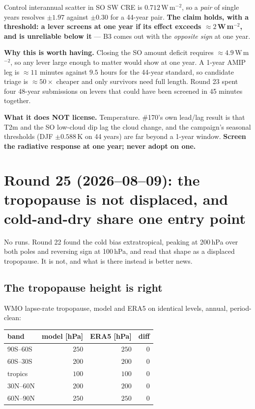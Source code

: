 \documentclass[10pt]{article}
\begin{document}
\noindent Control interannual scatter in SO SW CRE is $0.712$\,W\,m$^{-2}$, so a \emph{pair}
of single years resolves $\pm1.97$ against $\pm0.30$ for a 44-year pair. \textbf{The claim
holds, with a threshold: a lever screens at one year if its effect exceeds
${\approx}2$\,W\,m$^{-2}$, and is unreliable below it} --- B3 comes out with the
\emph{opposite sign} at one year.

\textbf{Why this is worth having.} Closing the SO amount deficit requires
${\approx}4.9$\,W\,m$^{-2}$, so any lever large enough to matter would show at one year. A
1-year AMIP leg is ${\approx}11$ minutes against $9.5$ hours for the 44-year standard, so
candidate triage is ${\approx}50\times$ cheaper and only survivors need full length. Round 23
spent four 48-year submissions on levers that could have been screened in 45 minutes
together.

\textbf{What it does NOT license.} Temperature. \#170's own lead/lag result is that T2m and
the SO low-cloud dip lag the cloud change, and the campaign's seasonal thresholds
(DJF $\pm0.588$\,K on 44 years) are far beyond a 1-year window. \textbf{Screen the radiative
response at one year; never adopt on one.}

\section{Round 25 (2026--08--09): the tropopause is not displaced, and cold-and-dry
share one entry point}\label{sec:r25}
No runs. Round 22 found the cold bias extratropical, peaking at 200\,hPa over both poles and
reversing sign at 100\,hPa, and read that shape as a displaced tropopause. It is not, and
what is there instead is better news.

\subsection{The tropopause height is right}\label{sub:r25height}
WMO lapse-rate tropopause, model and ERA5 on identical levels, annual, period-clean:

\begin{center}\footnotesize
\begin{tabular}{l r r r}
\toprule
band & model [hPa] & ERA5 [hPa] & diff \\
\midrule
90S--60S & $250$ & $250$ & $0$ \\
60S--30S & $200$ & $200$ & $0$ \\
tropics & $100$ & $100$ & $0$ \\
30N--60N & $200$ & $200$ & $0$ \\
60N--90N & $250$ & $250$ & $0$ \\
\bottomrule
\end{tabular}
\end{center}
\end{document}
